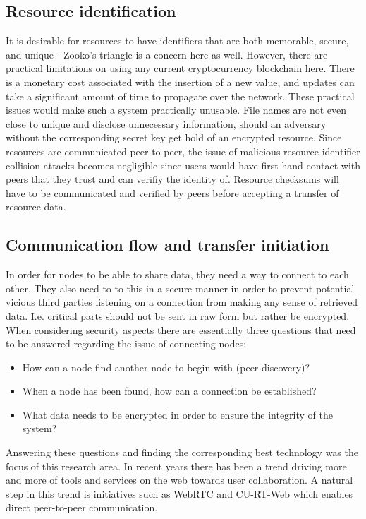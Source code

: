 \subsection{Resource identification}
It is desirable for resources to have identifiers that are both memorable, secure, and unique - Zooko’s triangle is a concern here as well. However, there are practical limitations on using any current cryptocurrency blockchain here. There is a monetary cost associated with the insertion of a new value, and updates can take a significant amount of time to propagate over the network. These practical issues would make such a system practically unusable. File names are not even close to unique and disclose unnecessary information, should an adversary without the corresponding secret key get hold of an encrypted resource. Since resources are communicated peer-to-peer, the issue of malicious resource identifier collision attacks becomes negligible since users would have first-hand contact with peers that they trust and can verifiy the identity of. Resource checksums will have to be communicated and verified by peers before accepting a transfer of resource data.

\subsection{Communication flow and transfer initiation}

In order for nodes to be able to share data, they need a way to connect to each other. They also need to to this in a secure manner in order to prevent potential vicious third parties listening on a connection from making any sense of retrieved data. I.e. critical parts should not be sent in raw form but rather be encrypted. When considering security aspects there are essentially three questions that need to be answered regarding the issue of connecting nodes:

\begin{itemize}
\item How can a node find another node to begin with (peer discovery)?
\item When a node has been found, how can a connection be established?
\item What data needs to be encrypted in order to ensure the integrity of the system?
\end{itemize}

Answering these questions and finding the corresponding best technology was the focus of this research area. In recent years there has been a trend driving more and more of tools and services on the web towards user collaboration. A natural step in this trend is initiatives such as WebRTC and CU-RT-Web which enables direct peer-to-peer communication.
